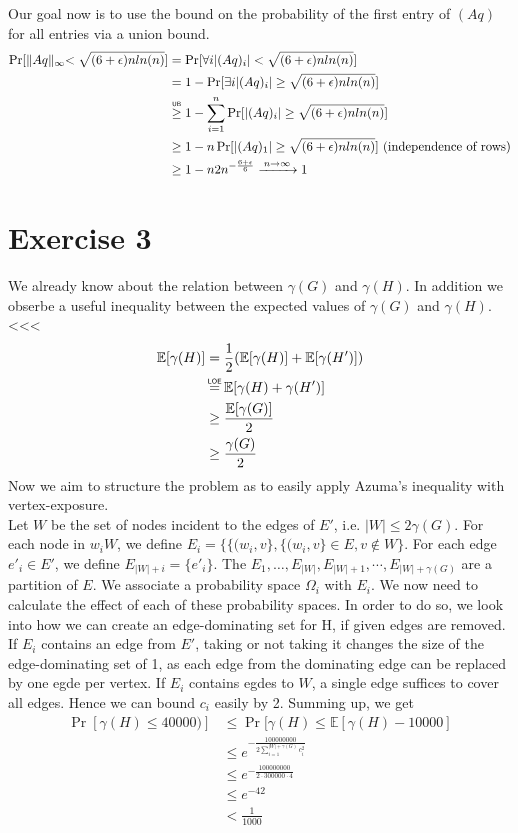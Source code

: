 \documentclass[a4paper,german]{article}
\newcommand\loe{\mathrel{\overset{\makebox[0pt]{\mbox{\normalfont\tiny\sffamily LOE}}}{=}}}
\newcommand\gequb{\mathrel{\overset{\makebox[0pt]{\mbox{\normalfont\tiny\sffamily UB}}}{\geq}}}
\newcommand{\E}{\mathbb{E}}
\begin{document}
Our goal now is to use the bound on the probability of the first entry of \( (Aq) \) for all entries via a union bound.
\begin{align*}
\Pr[ \lVert Aq \lVert_{\infty} < \sqrt {(6+\epsilon)nln(n)}] &= \Pr[ \forall i  |(Aq)_i|  < \sqrt {(6+\epsilon)nln(n)}] \\
&= 1 - \Pr[ \exists i  |(Aq)_i|  \geq \sqrt {(6+\epsilon)nln(n)}] \\
&\gequb 1 - \sum_{i=1}^n \Pr[|(Aq)_i|  \geq \sqrt {(6+\epsilon)nln(n)}] \\
&\geq 1 - n \Pr[|(Aq)_1|  \geq \sqrt {(6+\epsilon)nln(n)}] \text{     (independence of rows)}\\
&\geq 1 - n 2 n^{-\frac{6+\epsilon}{6}}  \xrightarrow{\: n \to \infty \: } 1
\end{align*}
\section*{Exercise 3}
We already know about the relation between \(\gamma(G)\) and \( \gamma(H)\). In addition we obserbe a useful inequality between the expected values of \(\gamma(G)\) and \( \gamma(H)\). <<<
\begin{align*}
\E[\gamma(H)] & = \frac{1}{2} (\E[\gamma(H)] + \E[\gamma(H')]) \\
&\loe \E[\gamma(H) + \gamma(H')] \\
&\geq \frac{\E[\gamma(G)]}{2} \\
&\geq \frac{\gamma(G)}{2}
\end{align*}
Now we aim to structure the problem as to easily apply Azuma's inequality with vertex-exposure. \\
Let \(W\) be the set of nodes incident to the edges of \(E'\), i.e. \(|W| \leq 2\gamma(G)\). For each node in \(w_i W\), we define \(E_i = \{\{(w_i, v\}, \{(w_i, v\} \in E, v \notin W\}\). For each edge \(e'_i \in E'\), we define \(E_{|W| + i} = \{e'_i\}\). The \(E_1, \dots, E_{|W|}, E_{|W| + 1}, \cdots, E_{|W| + \gamma(G)}\) are a partition of \(E\). We associate a probability space \(\Omega_i\) with \(E_i\).
We now need to calculate the effect of each of these probability spaces. In order to do so, we look into how we can create an edge-dominating set for H, if given edges are removed. If \(E_i\) contains an edge from \(E'\), taking or not taking it changes the size of the edge-dominating set of 1, as each edge from the dominating edge can be replaced by one egde per vertex. If \(E_i\) contains egdes to \(W\), a single edge suffices to cover all edges. 
Hence we can bound \(c_i\) easily by 2.
Summing up, we get
\begin{align*}
\Pr[\gamma(H) \leq 40000)] &\leq \Pr[\gamma(H) \leq \E[\gamma(H) - 10000] \\
&\leq e^{-\frac{100000000}{2 \sum_{i=1}^{|W| + \gamma(G)} c_i^2}} \\
&\leq e^{-\frac{100000000}{2 \cdot 300000 \cdot 4}} \\
& \leq e^{-42} \\
& < \frac{1}{1000}
\end{align*}
\end{document}

